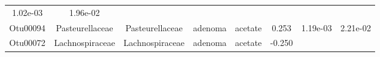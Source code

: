 \documentclass[11pt,]{article}
\begin{document}
\begin{longtable}[]{@{}cccccccc@{}}
\begin{minipage}[t]{0.08\columnwidth}
1.02e-03\strut
\end{minipage} & \begin{minipage}[t]{0.08\columnwidth}\centering\strut
1.96e-02\strut
\end{minipage}\tabularnewline
\begin{minipage}[t]{0.08\columnwidth}\centering\strut
Otu00094\strut
\end{minipage} & \begin{minipage}[t]{0.15\columnwidth}\centering\strut
Pasteurellaceae\strut
\end{minipage} & \begin{minipage}[t]{0.15\columnwidth}\centering\strut
Pasteurellaceae\strut
\end{minipage} & \begin{minipage}[t]{0.08\columnwidth}\centering\strut
adenoma\strut
\end{minipage} & \begin{minipage}[t]{0.09\columnwidth}\centering\strut
acetate\strut
\end{minipage} & \begin{minipage}[t]{0.07\columnwidth}\centering\strut
0.253\strut
\end{minipage} & \begin{minipage}[t]{0.08\columnwidth}\centering\strut
1.19e-03\strut
\end{minipage} & \begin{minipage}[t]{0.08\columnwidth}\centering\strut
2.21e-02\strut
\end{minipage}\tabularnewline
\begin{minipage}[t]{0.08\columnwidth}\centering\strut
Otu00072\strut
\end{minipage} & \begin{minipage}[t]{0.15\columnwidth}\centering\strut
Lachnospiraceae\strut
\end{minipage} & \begin{minipage}[t]{0.15\columnwidth}\centering\strut
Lachnospiraceae\strut
\end{minipage} & \begin{minipage}[t]{0.08\columnwidth}\centering\strut
adenoma\strut
\end{minipage} & \begin{minipage}[t]{0.09\columnwidth}\centering\strut
acetate\strut
\end{minipage} & \begin{minipage}[t]{0.07\columnwidth}\centering\strut
-0.250\strut
\end{minipage} & \begin{minipage}[t]{0.08\columnwidth}\centering\strut

\end{minipage}
\end{longtable}
\end{document}
